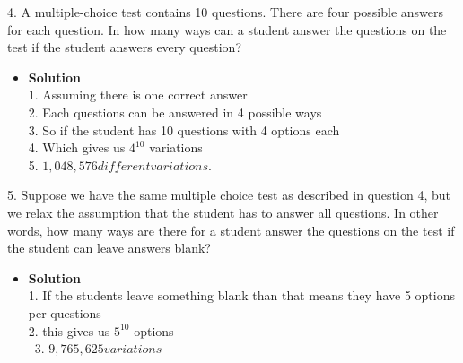 \documentclass[11pt]{article}
\begin{document}
\pagebreak 
\begin{enumerate}

\begin{flushleft}
{\large 4. A multiple-choice test contains 10 questions. There are four possible answers for each question. In how many ways can a student answer the questions on the test if the student answers every question?}
\end{flushleft}

\begin{itemize}

\item \textbf{Solution}\\
\large 1. Assuming there is one correct answer \\
\large 2. Each questions can be answered in 4 possible ways \\
\large 3. So if the student has 10 questions with 4 options each\\
\large 4. Which gives us $4^{10}$ variations\\
\large 5. \therefore \hspace{.2cm}$1,048,576 different variations. $\\


\end {itemize}
\end {enumerate}


\begin{enumerate}

\begin{flushleft}
{\large 5. Suppose we have the same multiple choice test as described in question 4, but we relax the assumption that the student has to answer all questions. In other words, how many ways are there for a student answer the questions on the test if the student can leave answers blank?}
\end{flushleft}

\begin{itemize}

\item \textbf{Solution}\\
\large 1. If the students leave something blank than that means they have 5 options per questions\\
\large 2. this gives us $5^{10}$ options\\
\
\large 3. \therefore \hspace{.2cm}$9,765,625 variations$\\


\end {itemize}
\end {enumerate}
\end{document}

